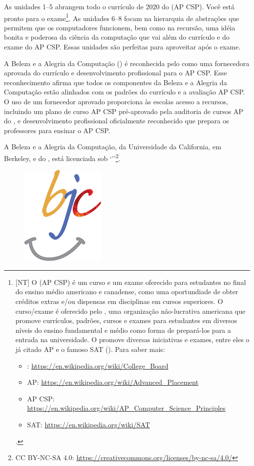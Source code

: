As unidades 1--5 abrangem todo o currículo de 2020 do  (AP CSP). Você está pronto para o exame\footnote{%
[NT] O  (AP CSP) é um
curso e um exame oferecido para estudantes no final do ensino médio americano e
canadense, como uma oportundiade de obter créditos extras e/ou dispensas em
disciplinas em cursos superiores. O curso/exame é oferecido pelo , uma organização não-lucrativa americana que promove currículos, padrões,
cursos e exames para estudantes em diversos níveis do ensino fundamental e médio
como forma de prepará-los para a entrada na universidade. O  promove diversas iniciativas e exames, entre eles o já citado AP e o
famoso SAT (). Para saber mais:
\begin{itemize}[noitemsep]
\item {}: \url{https://en.wikipedia.org/wiki/College_Board}
\item AP: \url{https://en.wikipedia.org/wiki/Advanced_Placement}
\item AP CSP: \url{https://en.wikipedia.org/wiki/AP_Computer_Science_Principles}
\item SAT: \url{https://en.wikipedia.org/wiki/SAT}
\end{itemize}.}. As unidades 6--8 focam na hierarquia de abstrações que permitem
que os computadores funcionem, bem como na recursão, uma idéia bonita e poderosa
da ciência da computação que vai além do currículo e do exame do AP CSP. Essas
unidades são perfeitas para aproveitar após o exame.

A Beleza e a Alegria da Computação () é
reconhecida pelo  como uma fornecedora aprovada do
currículo e desenvolvimento profissional para o AP CSP. Esse reconhecimento
afirma que todos os componentes da Beleza e a Alegria da Computação estão
alinhados com os padrões do currículo e a avaliação AP CSP. O uso de um
fornecedor aprovado proporciona às escolas acesso a recursos, incluindo um plano
de curso AP CSP pré-aprovado pela auditoria de cursos AP do , e desenvolvimento profissional oficialmente reconhecido que prepara os
professores para ensinar o AP CSP.

A Beleza e a Alegria da Computação, da Universidade da California, em Berkeley,
e do , está licenciada sob 
`''\footnote{CC BY-NC-SA 4.0:
\url{https://creativecommons.org/licenses/by-nc-sa/4.0/}}.

\begin{figure}[h]
\centering
  \includegraphics[scale=1.5]{imagens/bjc-logo.jpg}
\end{figure}
